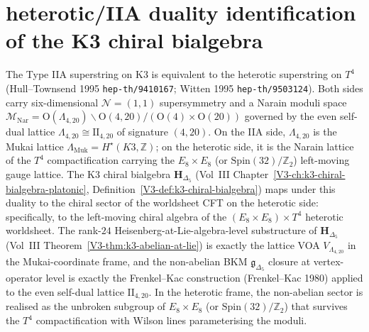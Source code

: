 \section{heterotic/IIA duality identification of the K3 chiral bialgebra}
\label{sec:modular-pva-witten-het-iia}

\begin{remark}
\label{rem:witten-het-iia-mukai-narain}
%
%
%
The Type IIA superstring on K3 is equivalent to the heterotic superstring
on $T^{4}$ (Hull--Townsend 1995 \texttt{hep-th/9410167}; Witten 1995
\texttt{hep-th/9503124}). Both sides carry six-dimensional
$\mathcal{N} = (1,1)$ supersymmetry and a Narain moduli space
$\mathcal{M}_{\mathrm{Nar}} = \mathrm{O}(\Lambda_{4,20}) \backslash
\mathrm{O}(4,20) / (\mathrm{O}(4) \times \mathrm{O}(20))$ governed by the
even self-dual lattice $\Lambda_{4,20} \cong \mathrm{II}_{4,20}$ of
signature $(4,20)$. On the IIA side, $\Lambda_{4,20}$ is the Mukai
lattice $\Lambda_{\mathrm{Muk}} = H^\star(K3, \mathbb{Z})$; on the
heterotic side, it is the Narain lattice of the $T^{4}$ compactification
carrying the $E_8 \times E_8$ (or $\mathrm{Spin}(32)/\mathbb{Z}_{2}$) left-moving
gauge lattice. The K3 chiral bialgebra
$\mathbf{H}_{\Delta_{5}}$ (Vol~III Chapter~\ref*{V3-ch:k3-chiral-bialgebra-platonic},
Definition~\ref*{V3-def:k3-chiral-bialgebra}) maps under this duality to the
chiral sector of the worldsheet CFT on the heterotic side: specifically,
to the left-moving chiral algebra of the $(E_{8} \times E_{8}) \times T^{4}$
heterotic worldsheet. The rank-$24$ Heisenberg-at-Lie-algebra-level
substructure of $\mathbf{H}_{\Delta_{5}}$ (Vol~III
Theorem~\ref*{V3-thm:k3-abelian-at-lie}) is exactly the lattice VOA
$V_{\Lambda_{4,20}}$ in the Mukai-coordinate frame, and the non-abelian
BKM $\mathfrak{g}_{\Delta_{5}}$ closure at vertex-operator level is
exactly the Frenkel--Kac construction (Frenkel--Kac 1980) applied to the
even self-dual lattice $\mathrm{II}_{4,20}$. In the heterotic frame, the
non-abelian sector is realised as the unbroken subgroup of
$E_{8} \times E_{8}$ (or $\mathrm{Spin}(32)/\mathbb{Z}_{2}$) that survives
the $T^{4}$ compactification with Wilson lines parameterising the moduli.
\end{remark}

